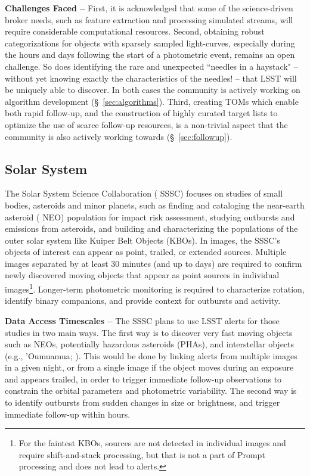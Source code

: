 {\bf Challenges Faced --}
First, it is acknowledged that some of the science-driven broker needs, such as feature extraction and processing simulated streams, will require considerable computational resources.
Second, obtaining robust categorizations for objects with sparsely sampled light-curves, especially during the hours and days following the start of a photometric event, remains an open challenge.
So does identifying the rare and unexpected ``needles in a haystack" -- without yet knowing exactly the characteristics of the needles! -- that  {LSST} will be uniquely able to discover.
In both cases the community is actively working on  {algorithm} development (\S~\ref{sec:algorithms}).
Third, creating TOMs which enable both rapid follow-up, and the construction of highly curated target lists to optimize the use of scarce follow-up resources, is a non-trivial aspect that the community is also actively working towards (\S~\ref{sec:followup}).


\subsection{Solar System}\label{ssec:sci_ss}

The Solar System  {Science Collaboration} ( {SSSC}) focuses on studies of small bodies, asteroids and minor planets, such as finding and cataloging the near-earth asteroid ( {NEO}) population for impact risk assessment, studying outbursts and emissions from asteroids, and building and characterizing the populations of the outer solar system like Kuiper Belt Objects (KBOs).
In images, the  {SSSC}'s objects of interest can appear as point, trailed, or extended sources.
Multiple images separated by at least 30 minutes (and up to days) are required to confirm newly discovered moving objects that appear as point sources in individual images\footnote{For the faintest KBOs, sources are not detected in individual images and require shift-and-stack processing, but that is not a part of Prompt processing and does not lead to alerts.}.
Longer-term photometric  {monitoring} is required to characterize rotation, identify binary companions, and provide context for outbursts and activity. 

{\bf Data Access Timescales --}
The  {SSSC} plans to use  {LSST} alerts for those studies in two main ways.
The first way is to discover very fast moving objects such as NEOs, potentially hazardous asteroids (PHAs), and interstellar objects (e.g., 'Oumuamua; \citealt{Meech2017}).
This would be done by linking alerts from multiple images in a given night, or from a single image if the object moves during an exposure and appears trailed, in order to trigger immediate follow-up observations to constrain the orbital parameters and photometric variability.
The second way is to identify outbursts from sudden changes in size or brightness, and trigger immediate follow-up within hours.

